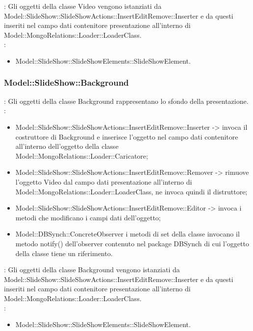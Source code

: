 {{\begin{itemize}
				\end{itemize}	
                \textbf{\interfacce}: Gli oggetti della classe Video vengono istanziati da Model::SlideShow::SlideShowActions::InsertEditRemove::Inserter e da questi inseriti nel campo dati contenitore presentazione all’interno di \\Model::MongoRelations::Loader::LoaderClass.\\
                \textbf{\base}: 
                    \begin{itemize}
                    \item Model::SlideShow::SlideShowElements::SlideShowElement.
                    \end{itemize}
                    }     
                 \subsubsection{Model::SlideShow::Background}{
                				\textbf{\tipo}: Gli oggetti della classe Background rappresentano lo sfondo della presentazione.\\
                				\textbf{\relaz}: 
                				\begin{itemize}
                					\item Model::SlideShow::SlideShowActions::InsertEditRemove::Inserter -> invoca il costruttore di Background e inserisce l’oggetto nel campo dati contenitore all’interno dell’oggetto della classe Model::MongoRelations::Loader::Caricatore;
                                    \item Model::SlideShow::SlideShowActions::InsertEditRemove::Remover -> rimuove l’oggetto Video dal campo dati presentazione all’interno di Model::MongoRelations::Loader::LoaderClass, ne invoca quindi il distruttore;
                                    \item Model::SlideShow::SlideShowActions::InsertEditRemove::Editor -> invoca i metodi che modificano i campi dati dell'oggetto;
                    \item Model::DBSynch::ConcreteObserver i metodi di set della classe invocano il metodo notify() dell'observer contenuto nel package DBSynch di cui l'oggetto della classe tiene un riferimento.
                				\end{itemize}	
                                \textbf{\interfacce}: Gli oggetti della classe Background vengono istanziati da Model::SlideShow::SlideShowActions::InsertEditRemove::Inserter e da questi inseriti nel campo dati contenitore presentazione all’interno di\\ Model::MongoRelations::Loader::LoaderClass.\\
                                \textbf{\base}: 
                                    \begin{itemize}
                                    \item Model::SlideShow::SlideShowElements::SlideShowElement.
                                    \end{itemize}
                                    }              
}


